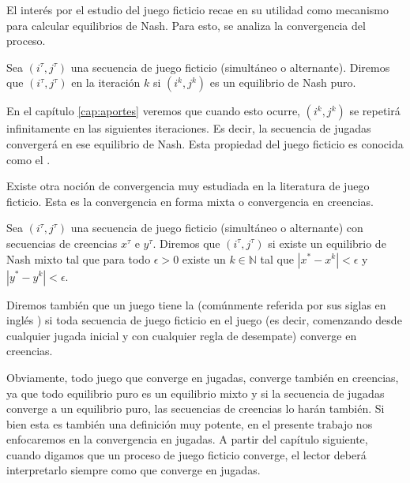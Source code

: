 El interés por el estudio del juego ficticio recae en su utilidad como mecanismo para calcular equilibrios de Nash. Para esto, se analiza la convergencia del proceso.

\begin{definition}

    Sea $(i^\tau, j^\tau)$ una secuencia de juego ficticio (simultáneo o alternante). Diremos que $(i^\tau, j^\tau)$  en la iteración $k$ si $(i^k, j^k)$ es un equilibrio de Nash puro.

\end{definition}

En el capítulo \ref{cap:aportes} veremos que cuando esto ocurre, $(i^k, j^k)$ se repetirá infinitamente en las siguientes iteraciones. Es decir, la secuencia de jugadas convergerá en ese equilibrio de Nash. Esta propiedad del juego ficticio es conocida como el .


Existe otra noción de convergencia muy estudiada en la literatura de juego ficticio. Esta es la convergencia en forma mixta o convergencia en creencias.

\begin{definition}
    Sea $(i^\tau, j^\tau)$ una secuencia de juego ficticio (simultáneo o alternante) con secuencias de creencias $x^\tau$ e $y^\tau$. Diremos que $(i^\tau, j^\tau)$  si existe un equilibrio de Nash mixto tal que para todo $\epsilon > 0$ existe un $k \in \mathbb{N}$ tal que $|x^* - x^k| < \epsilon$ y $|y^* - y^k| < \epsilon$.
\end{definition}

Diremos también que un juego tiene la  (comúnmente referida por sus siglas en inglés ) si toda secuencia de juego ficticio en el juego (es decir, comenzando desde cualquier jugada inicial y con cualquier regla de desempate) converge en creencias.

Obviamente, todo juego que converge en jugadas, converge también en creencias, ya que todo equilibrio puro es un equilibrio mixto y si la secuencia de jugadas converge a un equilibrio puro, las secuencias de creencias lo harán también.
Si bien esta es también una definición muy potente, en el presente trabajo nos enfocaremos en la convergencia en jugadas. A partir del capítulo siguiente, cuando digamos que un proceso de juego ficticio converge, el lector deberá interpretarlo siempre como que converge en jugadas.

